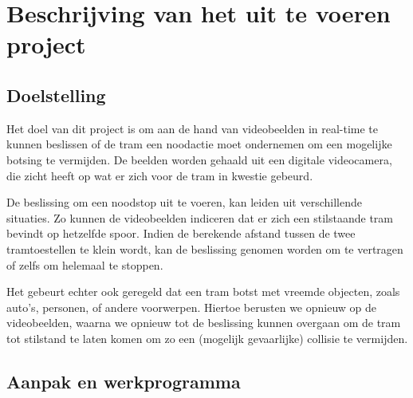 \documentclass[]{book}
\begin{document}

\section{Beschrijving van het uit te voeren project}\label{sec:Beschrijving}

\subsection{Doelstelling}\label{sec:Doelstelling}


Het doel van dit project is om aan de hand van videobeelden in real-time te kunnen beslissen of de tram een noodactie moet ondernemen om een mogelijke botsing te vermijden. De beelden worden gehaald uit een digitale videocamera, die zicht heeft op wat er zich voor de tram in kwestie gebeurd.

De beslissing om een noodstop uit te voeren, kan leiden uit verschillende situaties. Zo kunnen de videobeelden indiceren dat er zich een stilstaande tram bevindt op hetzelfde spoor. Indien de berekende afstand tussen de twee tramtoestellen te klein wordt, kan de beslissing genomen worden om te vertragen of zelfs om helemaal te stoppen.

Het gebeurt echter ook geregeld dat een tram botst met vreemde objecten, zoals auto's, personen, of andere voorwerpen. Hiertoe berusten we opnieuw op de videobeelden, waarna we opnieuw tot de beslissing kunnen overgaan om de tram tot stilstand te laten komen om zo een (mogelijk gevaarlijke) collisie te vermijden.


\subsection{Aanpak en werkprogramma}\label{sec:Aanpak}
\end{document}
